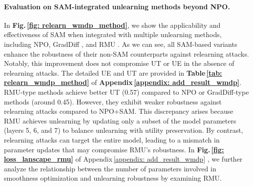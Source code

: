 \paragraph{Evaluation on SAM-integrated unlearning methods beyond NPO.} In \textbf{Fig.\,\ref{fig: relearn_wmdp_method}},
we show the applicability and effectiveness of SAM when integrated with multiple unlearning methods, including NPO, GradDiff \citep{maini2024tofu}, and RMU \citep{li2024wmdp}. 
%
As we can see, all SAM-based variants enhance the robustness of their non-SAM counterparts against relearning attacks. Notably, this improvement does not compromise UT or UE in the absence of relearning attacks. The detailed UE and UT are provided in \textbf{Table\,\ref{tab: relearn_wmdp_method}} of \textbf{Appendix\,\ref{appendix: add_result_wmdp}}. RMU-type methods achieve better UT (0.57) compared to NPO or GradDiff-type methods (around 0.45). However, they exhibit weaker robustness against relearning attacks compared to NPO+SAM. This discrepancy arises because RMU achieves unlearning by updating only a subset of the model parameters (layers 5, 6, and 7) to balance unlearning with utility preservation. By contrast, relearning attacks can target the entire model, leading to a mismatch in parameter updates that may compromise RMU's robustness. In \textbf{Fig.\,\ref{fig: loss_lanscape_rmu}} of Appendix\,\ref{appendix: add_result_wmdp} , we further analyze the relationship between the number of parameters involved in smoothness optimization and unlearning robustness by examining RMU.

